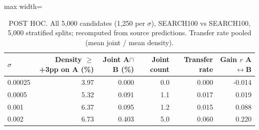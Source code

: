 \begin{table}[t]
\centering
\small
\begin{adjustbox}{max width=\linewidth}
\begin{tabular}{lrrrrr}
\toprule
$\sigma$ & Density $\ge$+3pp on A (\%) & Joint A$\cap$B (\%) & Joint count & Transfer rate & Gain $r$ A$\leftrightarrow$B \\
\midrule
0.00025 & 3.97 & 0.000 & 0.0 & 0.000 & -0.014 \\
0.0005 & 5.32 & 0.091 & 1.1 & 0.017 & 0.019 \\
0.001 & 6.37 & 0.095 & 1.2 & 0.015 & 0.088 \\
0.002 & 6.73 & 0.403 & 5.0 & 0.060 & 0.220 \\
\bottomrule
\end{tabular}
\end{adjustbox}
\caption{POST HOC. All 5,000 candidates (1,250 per $\sigma$), SEARCH100 vs SEARCH100, 5,000 stratified splits; recomputed from source predictions. Transfer rate pooled (mean joint / mean density).}
\label{tab:radius-density}
\end{table}
